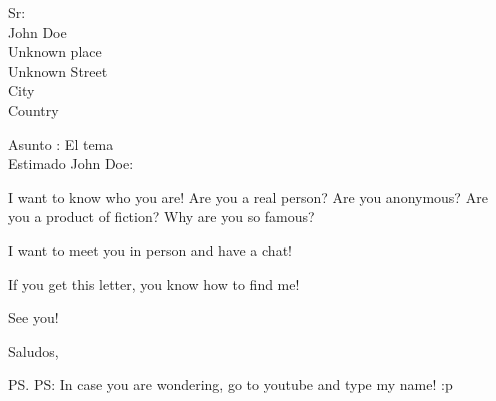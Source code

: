 \documentclass[12pt, letterpaper]{letter}
\date{Pereira, Agosto 23 de 2017}
\begin{document}
\begin{letter}{
Sr: \\ John Doe \\ Unknown place \\ Unknown Street \\ City \\ Country }



\opening{Asunto : El tema \\ \newline Estimado John Doe:}

I want to know who you are! Are you a real person? Are you anonymous? Are you a product of fiction? Why are you so famous?

I want to meet you in person and have a chat!

If you get this letter, you know how to find me!

See you!

\closing{Saludos,}

\ps{PS: In case you are wondering, go to youtube and type my name! :p}



\end{letter}
\end{document}

